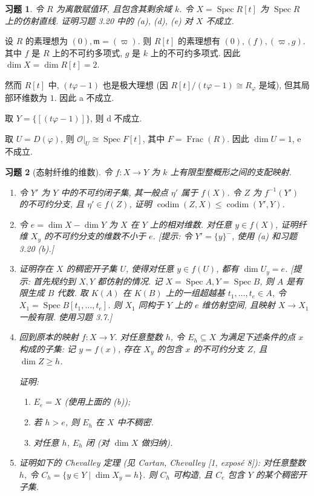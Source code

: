 \documentclass{article}
\theoremstyle{exercise}
\newtheorem{exercise}{习题}[section]
\newenvironment{proofc}{\proof}{\endproof}
\def\gm{\mathfrak{m}}
\def\cO{\mathcal{O}}
\def\Spec{\operatorname{Spec}}
\def\dim{\operatorname{dim}}
\def\codim{\operatorname{codim}}
\def\Frac{\operatorname{Frac}}
\def\leq{\leqslant}
\def\geq{\geqslant}
\begin{document}
\begin{exercise}
  令 $R$ 为离散赋值环, 且包含其剩余域 $k$.
  令 $X = \Spec R[t]$ 为 $\Spec R$ 上的仿射直线.
  证明习题 3.20 中的 (a), (d), (e) 对 $X$ 不成立.
\end{exercise}

\begin{proofc}
  设 $R$ 的素理想为 $(0), \gm = (\varpi)$.
  则 $R[t]$ 的素理想有 $(0), (f), (\varpi, g)$. 其中 $f$ 是 $R$ 上的不可约多项式,
  $g$ 是 $k$ 上的不可约多项式. 因此 $\dim X = \dim R[t] = 2$.

  然而 $R[t]$ 中, $(t\varphi - 1)$ 也是极大理想
  (因 $R[t] / (t\varphi - 1) \cong R_{\varphi}$ 是域),
  但其局部环维数为 $1$. 因此 a 不成立.

  取 $Y = \{ [(t\varphi - 1)] \}$, 则 d 不成立.

  取 $U = D(\varphi)$, 则 $\cO|_U \cong \Spec F[t]$, 其中 $F = \Frac(R)$.
  因此 $\dim U = 1$, e 不成立.
\end{proofc}

\begin{exercise}[态射纤维的维数]
  令 $f \colon X \to Y$ 为 $k$ 上有限型整概形之间的支配映射.
  \begin{enumerate}[label={(\alph*)}]
    \item 令 $Y'$ 为 $Y$ 中的不可约闭子集, 其一般点 $\eta'$ 属于 $f(X)$.
          令 $Z$ 为 $f^{-1}(Y')$ 的不可约分支, 且 $\eta' \in f(Z)$,
          证明 $\codim(Z, X) \leq \codim(Y', Y)$.
    \item 令 $e = \dim X - \dim Y$ 为 $X$ 在 $Y$ 上的\emph{相对维数}.
          对任意 $y \in f(X)$, 证明纤维 $X_y$ 的不可约分支的维数不小于 $e$.
          [\emph{提示: 令 $Y' = \{y\}^-$, 使用 (a) 和习题 3.20 (b).}]
    \item 证明存在 $X$ 的稠密开子集 $U$, 使得对任意 $y \in f(U)$,
          都有 $\dim U_y = e$.
          [\emph{提示: 首先规约到 $X, Y$ 都仿射的情况. 记 $X = \Spec A, Y = \Spec B$,
          则 $A$ 是有限生成 $B$ 代数. 取 $K(A)$ 在 $K(B)$ 上的一组超越基
          $t_1, \dots, t_e \in A$, 令 $X_1 = \Spec B[t_1, \dots, t_e]$.
          则 $X_1$ 同构于 $Y$ 上的 $e$ 维仿射空间,
          且映射 $X \to X_1$ 一般有限. 使用习题 3.7.}]
    \item 回到原本的映射 $f \colon X \to Y$.
          对任意整数 $h$, 令 $E_h \subseteq X$ 为满足下述条件的点 $x$ 构成的子集:
          记 $y = f(x)$, 存在 $X_y$ 的包含 $x$ 的不可约分支 $Z$, 且 $\dim Z \geq h$.

          证明:
          \begin{enumerate}[label={\arabic*.}]
            \item $E_e = X$ (使用上面的 (b));
            \item 若 $h > e$, 则 $E_h$ 在 $X$ 中不稠密.
            \item 对任意 $h$, $E_h$ 闭 (对 $\dim X$ 做归纳).
          \end{enumerate}
    \item 证明如下的 Chevalley 定理 (见 Cartan, Chevalley [1, exposé 8]):
          对任意整数 $h$, 令 $C_h = \{ y \in Y \mid \dim X_y = h \}$.
          则 $C_h$ 可构造, 且 $C_e$ 包含 $Y$ 的某个稠密开子集.
  \end{enumerate}
\end{exercise}
\end{document}
